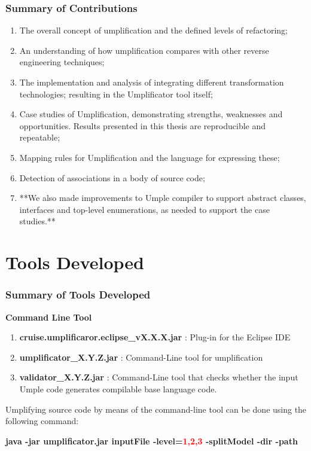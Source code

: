 \documentclass[xcolor=table]{beamer}
\begin{document}
\begin{frame}
\frametitle{Summary of Contributions}
\begin{enumerate}
\item The overall concept of umplification and the defined levels of refactoring;

\item An understanding of how umplification compares with other reverse engineering techniques;

\item The implementation and analysis of integrating different transformation technologies;  resulting in the Umplificator tool itself;

\item Case studies of Umplification, demonstrating strengths, weaknesses and opportunities. Results presented in this thesis are reproducible and repeatable; 

\item Mapping rules for Umplification and the language for expressing these;

\item Detection of associations in a body of source code;

\item **{\scriptsize We also made improvements to Umple compiler  to support abstract classes, interfaces and top-level enumerations, as needed to support the case studies.}**
\end{enumerate}
\end{frame}

\section{Tools Developed}
\begin{frame}
\frametitle{Summary of Tools Developed}
\textcolor{important}{\textbf{Command Line Tool}}
\begin{enumerate}
\item \textbf{cruise.umplificaror.eclipse\_vX.X.X.jar} : Plug-in for the Eclipse IDE 
\item \textbf{umplificator\_X.Y.Z.jar} : Command-Line tool for umplification 
\item \textbf{validator\_X.Y.Z.jar} : Command-Line tool that checks whether the input Umple code generates compilable base language code. 
\end{enumerate}

Umplifying source code by means of the command-line tool can be done using the following command:
\newline

\textbf{java -jar umplificator.jar inputFile \textcolor{important}{-level}=\textcolor{red}{1,2,3} \textcolor{important}{-splitModel -dir -path}}
\end{frame}
\end{document}
